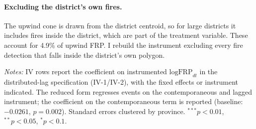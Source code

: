 \documentclass[12pt]{article}
\begin{document}
\paragraph{Excluding the district's own fires.} The upwind cone is drawn from the district centroid, so for large districts it includes fires inside the district, which are part of the treatment variable. These account for 4.9\% of upwind FRP. I rebuild the instrument excluding every fire detection that falls inside the district's own polygon.

\begin{table}[H]
\centering
\caption{Regional shocks and own-district fires}
\label{tab:regional}
\begin{minipage}{0.95\textwidth}
\vspace{4pt}
\footnotesize \emph{Notes:} IV rows report the coefficient on instrumented $\text{logFRP}_{dt}$ in the distributed-lag specification (IV-1/IV-2), with the fixed effects or instrument indicated. The reduced form regresses events on the contemporaneous and lagged instrument; the coefficient on the contemporaneous term is reported (baseline: $-0.0261$, $p=0.002$). Standard errors clustered by province. $^{***}p<0.01$, $^{**}p<0.05$, $^{*}p<0.1$.
\end{minipage}
\end{table}
\end{document}
